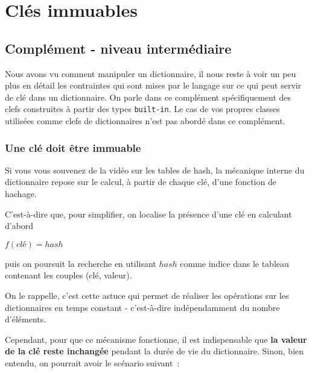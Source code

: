     
    
    
    

    

    \hypertarget{cluxe9s-immuables}{%
\section{Clés immuables}\label{cluxe9s-immuables}}

    \hypertarget{compluxe9ment---niveau-intermuxe9diaire}{%
\subsection{Complément - niveau
intermédiaire}\label{compluxe9ment---niveau-intermuxe9diaire}}

    Nous avons vu comment manipuler un dictionnaire, il nous reste à voir un
peu plus en détail les contraintes qui sont mises par le langage sur ce
qui peut servir de clé dans un dictionnaire. On parle dans ce complément
spécifiquement des clefs construites à partir des types
\texttt{built-in}. Le cas de vos propres classes utilisées comme clefs
de dictionnaires n'est pas abordé dans ce complément.

    \hypertarget{une-cluxe9-doit-uxeatre-immuable}{%
\subsubsection{Une clé doit être
immuable}\label{une-cluxe9-doit-uxeatre-immuable}}

    Si vous vous souvenez de la vidéo sur les tables de hash, la mécanique
interne du dictionnaire repose sur le calcul, à partir de chaque clé,
d'une fonction de hachage.

C'est-à-dire que, pour simplifier, on localise la présence d'une clé en
calculant d'abord

\(f(clé) = hash\)

puis on poursuit la recherche en utilisant \(hash\) comme indice dans le
tableau contenant les couples (clé, valeur).

On le rappelle, c'est cette astuce qui permet de réaliser les opérations
sur les dictionnaires en temps constant - c'est-à-dire indépendamment du
nombre d'éléments.

    Cependant, pour que ce mécanisme fonctionne, il est indispensable que
\textbf{la valeur de la clé reste inchangée} pendant la durée de vie du
dictionnaire. Sinon, bien entendu, on pourrait avoir le scénario
suivant~:

